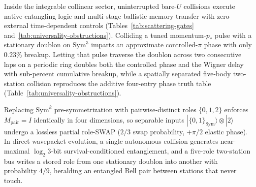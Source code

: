 Inside the integrable collinear sector, uninterrupted bare-$U$ collisions execute native entangling logic and multi-stage
ballistic memory transfer with zero external time-dependent controls (Tables~\ref{tab:scattering-gates}
and~\ref{tab:universality-obstructions}). Colliding a tuned momentum-$p_*$ pulse with a stationary doublon on
$\mathrm{Sym}^3$ imparts an approximate controlled-$\pi$ phase with only $0.23\%$ breakup. Letting that pulse traverse
the doublon across two consecutive laps on a periodic ring doubles both the controlled phase and the Wigner delay with
sub-percent cumulative breakup, while a spatially separated five-body two-station collision reproduces the additive
four-entry phase truth table (Table~\ref{tab:universality-obstructions}).

Replacing $\mathrm{Sym}^k$ pre-symmetrization with pairwise-distinct roles $\{0, 1, 2\}$ enforces $M_{\mathrm{pair}} = I$
identically in four dimensions, so separable inputs $|\{0,1\}_{\mathrm{Sym}}\rangle \otimes |2\rangle$ undergo a lossless
partial role-SWAP ($2/3$ swap probability, $+\pi/2$ elastic phase). In direct wavepacket evolution, a single autonomous
collision generates near-maximal $\log_2 3$-bit survival-conditioned entanglement, and a five-role two-station bus writes
a stored role from one stationary doublon into another with probability $4/9$, heralding an entangled Bell pair between
stations that never touch.

